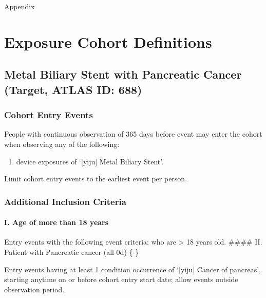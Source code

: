 \documentclass[
  12pt,
]{article}
\providecommand{\tightlist}{%
  \setlength{\itemsep}{0pt}\setlength{\parskip}{0pt}}
\begin{document}
\clearpage

\centerline{\Huge Appendix}

\appendix


\section{Exposure Cohort Definitions}\label{exposure-cohort-definitions}

\subsection{Metal Biliary Stent with Pancreatic Cancer (Target, ATLAS ID: 688)}\label{metal-biliary-stent-with-pancreatic-cancer-target-atlas-id-688}

\subsubsection{Cohort Entry Events}\label{cohort-entry-events}

People with continuous observation of 365 days before event may enter the cohort when observing any of the following:

\begin{enumerate}
\def\labelenumi{\arabic{enumi}.}
\tightlist
\item
  device exposures of `{[}yiju{]} Metal Biliary Stent'.
\end{enumerate}

Limit cohort entry events to the earliest event per person.

\subsubsection{Additional Inclusion Criteria}\label{additional-inclusion-criteria}

\paragraph*{I. Age of more than 18 years}\label{i.-age-of-more-than-18-years}

Entry events with the following event criteria: who are \textgreater{} 18 years old.
\#\#\#\# II. Patient with Pancreatic cancer (all-0d) \{-\}

Entry events having at least 1 condition occurrence of `{[}yiju{]} Cancer of pancreas', starting anytime on or before cohort entry start date; allow events outside observation period.
\end{document}
